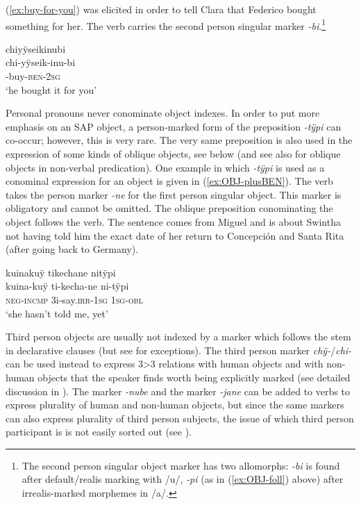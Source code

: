 (\ref{ex:buy-for-you}) was elicited in order to tell Clara that Federico bought something for her. The verb carries the second person singular marker \textit{-bi}.\footnote{The second person singular object marker has two allomorphs: \textit{-bi} is found after default/realis marking with /u/, \textit{-pi} (as in (\ref{ex:OBJ-foll}) above) after irrealis-marked morphemes in /a/.}


\ea\label{ex:buy-for-you}
\begingl
\glpreamble chiyÿseikinubi\\
\gla chi-yÿseik-inu-bi\\
-buy-\textsc{ben}-2\textsc{sg}\\
\glft ‘he bought it for you’
\endgl
\trailingcitation{[cxx-e120410ls-2.006]}
\xe
{}

Personal pronouns never conominate object indexes. In order to put more emphasis on an SAP object, a person-marked form of the preposition \textit{-tÿpi} can co-occur; however, this is very rare. The very same preposition is also used in the expression of some kinds of oblique objects, see  below (and see also  for oblique objects in non-verbal predication).
One example in which \textit{-tÿpi} is used as a conominal expression for an object is given in (\ref{ex:OBJ-plusBEN}). The verb takes the person marker \textit{-ne} for the first person singular object. This marker is obligatory and cannot be omitted. The oblique preposition conominating the object follows the verb. The sentence comes from Miguel and is about Swintha not having told him the exact date of her return to Concepción and Santa Rita (after going back to Germany).

\ea\label{ex:OBJ-plusBEN}
\begingl 
\glpreamble kuinakuÿ tikechane nitÿpi\\
\gla kuina-kuÿ ti-kecha-ne ni-tÿpi\\ 
\glb \textsc{neg}-\textsc{incmp} 3i-say.\textsc{irr}-1\textsc{sg} 1\textsc{sg}-\textsc{obl}\\ 
\glft ‘she hasn’t told me, yet’\\ 
\endgl
\trailingcitation{[mxx-d110813s-2.052]}
\xe


Third person objects are usually not indexed by a marker which follows the stem in declarative clauses (but see  for exceptions). The third person marker \textit{chÿ-}/\textit{chi-} can be used instead to express 3>3 relations with human objects and with non-human objects that the speaker finds worth being explicitly marked (see detailed discussion in ). The  marker \textit{-nube} and the  marker \textit{-jane} can be added to verbs to express plurality of human and non-human objects, but since the same markers can also express plurality of third person subjects, the issue of which third person participant is  is not easily sorted out (see ).

